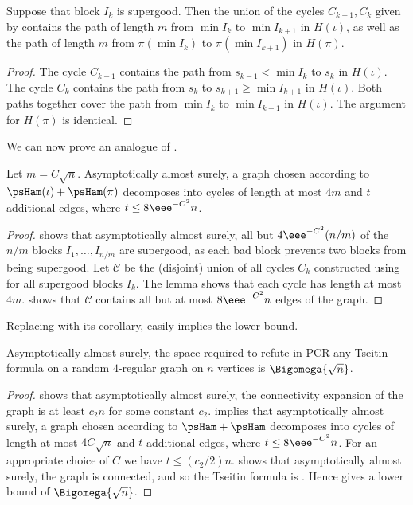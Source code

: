 \documentclass{toc}
\begin{document}
\begin{lemma} \label{lem:supergood}
 Suppose that block $I_k$ is supergood. Then the union of the cycles $C_{k-1},C_k$ given by  contains the path of length $m$ from $\min I_k$ to $\min I_{k+1}$ in $H(\iota)$, as well as the path of length $m$ from $\pi(\min I_k)$ to $\pi(\min I_{k+1})$ in $H(\pi)$.
\end{lemma}
\begin{proof}
 The cycle $C_{k-1}$ contains the path from $s_{k-1} < \min I_k$ to $s_k$ in $H(\iota)$. The cycle $C_k$ contains the path from $s_k$ to $s_{k+1} \geq \min I_{k+1}$ in $H(\iota)$. Both paths together cover the path from $\min I_k$ to $\min I_{k+1}$ in $H(\iota)$. The argument for $H(\pi)$ is identical.
\end{proof}

We can now prove an analogue of .

\begin{lemma} \label{lem:almost-partition}
 Let $m = C\sqrt{n}$. Asymptotically almost surely, a graph chosen according to $\psHam(\iota) + \psHam(\pi)$ decomposes into cycles of %
 length at most $4m$ and $t$ additional edges, where $t \leq 8\eee^{-C^2}n$.
\end{lemma}
\begin{proof}
  shows that asymptotically almost surely, all but $4\eee^{-C^2} (n/m)$ of the $n/m$ blocks $I_1,\ldots,I_{n/m}$ are supergood, as each bad block prevents two blocks from being supergood. Let $\mathcal{C}$ be the (disjoint) union of all cycles $C_k$ constructed using  for all supergood blocks $I_k$. The lemma shows that each cycle has %
 length at most $4m$.  shows that $\mathcal{C}$ contains all but at most $8\eee^{-C^2} n$ edges of the graph.
\end{proof}

Replacing  with its corollary,  easily implies the lower bound.

\begin{theorem} \label{thm:improved}
 Asymptotically almost surely, the space required to refute in PCR any Tseitin formula on a random $4$-regular graph on $n$ vertices is $\Bigomega{\sqrt{n}}$.
\end{theorem}
\begin{proof}
   shows that asymptotically almost surely, the connectivity expansion of the graph is at least $c_2 n$ %
  for some constant $c_2$. %
   implies that asymptotically almost surely, a graph chosen according to $\psHam + \psHam$ decomposes into cycles of %
 length at most $4C\sqrt{n}$ and $t$ additional edges, where $t \leq 8\eee^{-C^2}n$. For an appropriate choice of $C$ we have $t \leq (c_2/2)n$.
  shows that asymptotically almost surely, the graph is connected, and so the Tseitin formula is \Gnonsplittingnot.
 Hence  gives a lower bound of $\Bigomega{\sqrt{n}}$.
\end{proof}
\end{document}
